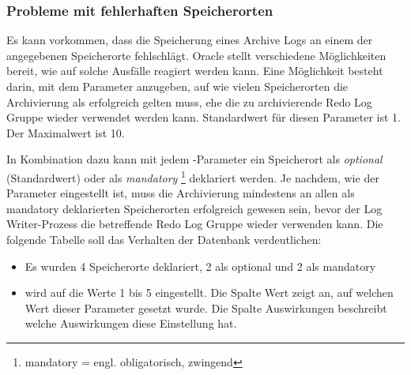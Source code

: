         \subsubsection{Probleme mit fehlerhaften Speicherorten}
          Es kann vorkommen, dass die Speicherung eines Archive Logs an einem der angegebenen Speicherorte fehlschlägt. Oracle stellt verschiedene Möglichkeiten bereit, wie auf solche Ausfälle reagiert werden kann. Eine Möglichkeit besteht darin, mit dem Parameter  anzugeben, auf wie vielen Speicherorten die Archivierung als erfolgreich gelten muss, ehe die zu archivierende Redo Log Gruppe wieder verwendet werden kann. Standardwert für diesen Parameter ist 1. Der Maximalwert ist 10.

          In Kombination dazu kann mit jedem -Parameter ein Speicherort als \textit{optional} (Standardwert) oder als \textit{mandatory} \footnote{mandatory = engl. obligatorisch, zwingend} deklariert werden. Je nachdem, wie der Parameter \newline {} eingestellt ist, muss die Archivierung mindestens an allen als mandatory deklarierten Speicherorten erfolgreich gewesen sein, bevor der Log Writer-Prozess die betreffende Redo Log Gruppe wieder verwenden kann.
\clearpage
          Die folgende Tabelle soll das Verhalten der Datenbank verdeutlichen:
          \begin{itemize}
            \item Es wurden 4 Speicherorte deklariert, 2 als optional und 2 als mandatory
            \item {} wird auf die Werte 1 bis 5 eingestellt. Die Spalte Wert zeigt an, auf welchen Wert dieser Parameter gesetzt wurde. Die Spalte Auswirkungen beschreibt welche Auswirkungen diese Einstellung hat.
          \end{itemize}
